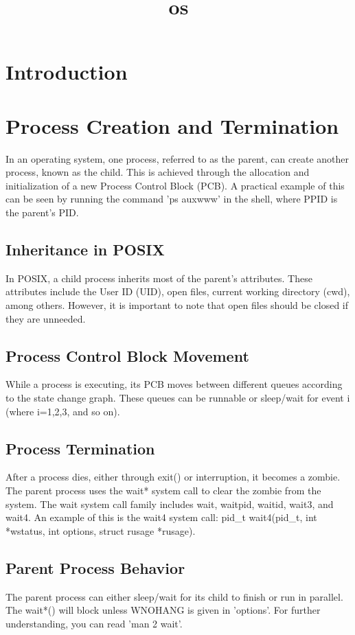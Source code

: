 \documentclass[12pt]{report}
\title{os}
\author{}
\begin{document}
\maketitle
\tableofcontents
\newpage

\section{Introduction}
  \section{Process Creation and Termination}  In an operating system, one process, referred to as the parent, can create another process, known as the child. This is achieved through the allocation and initialization of a new Process Control Block (PCB). A practical example of this can be seen by running the command 'ps auxwww' in the shell, where PPID is the parent's PID.   \subsection{Inheritance in POSIX}  In POSIX, a child process inherits most of the parent's attributes. These attributes include the User ID (UID), open files, current working directory (cwd), among others. However, it is important to note that open files should be closed if they are unneeded.   \subsection{Process Control Block Movement}  While a process is executing, its PCB moves between different queues according to the state change graph. These queues can be runnable or sleep/wait for event i (where i=1,2,3, and so on).  \subsection{Process Termination}  After a process dies, either through exit() or interruption, it becomes a zombie. The parent process uses the wait* system call to clear the zombie from the system. The wait system call family includes wait, waitpid, waitid, wait3, and wait4. An example of this is the wait4 system call: pid_t wait4(pid_t, int *wstatus, int options, struct rusage *rusage).   \subsection{Parent Process Behavior}  The parent process can either sleep/wait for its child to finish or run in parallel. The wait*() will block unless WNOHANG is given in 'options'. For further understanding, you can read 'man 2 wait'.  
\end{document}
